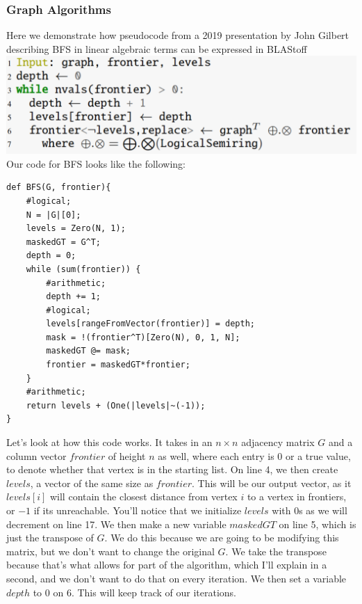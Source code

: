 \subsubsection{Graph Algorithms}
Here we demonstrate how pseudocode from a 2019 presentation by John Gilbert describing BFS in linear algebraic terms \cite{Gilbert} can be expressed in BLAStoff\\
\includegraphics[scale=0.4]{figures/graphBLAS BFS pseudocode.png}\\
Our code for BFS looks like the following:
\begin{lstlisting}
def BFS(G, frontier){
    #logical;
    N = |G|[0];
    levels = Zero(N, 1);
    maskedGT = G^T;
    depth = 0;
    while (sum(frontier)) {
        #arithmetic;
        depth += 1;
        #logical;
        levels[rangeFromVector(frontier)] = depth;
        mask = !(frontier^T)[Zero(N), 0, 1, N];
        maskedGT @= mask;
        frontier = maskedGT*frontier;
    }
    #arithmetic;
    return levels + (One(|levels|~(-1));
}
\end{lstlisting}
Let's look at how this code works.  It takes in an $n\times n$ adjacency matrix $G$ and a column vector $frontier$ of height $n$ as well, where each entry is 0 or a true value, to denote whether that vertex is in the starting list.  On line 4, we then create $levels$, a vector of the same size as $frontier$.  This will be our output vector, as it $levels[i]$ will contain the closest distance from vertex $i$ to a vertex in frontiers, or $-1$ if its unreachable.   You'll notice that we initialize $levels$ with 0s as we will decrement on line 17.  We then make a new variable $maskedGT$ on line 5, which is just the transpose of $G$.  We do this because we are going to be modifying this matrix, but we don't want to change the original $G$.  We take the transpose because that's what allows for part of the algorithm, which I'll explain in a second, and we don't want to do that on every iteration. We then set a variable $depth$ to 0 on 6.  This will keep track of our iterations.

